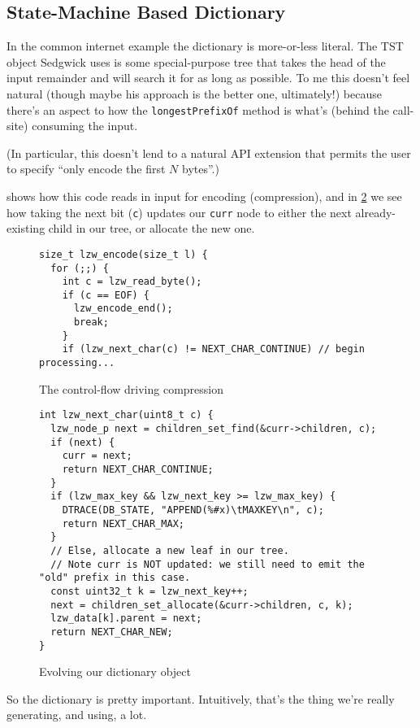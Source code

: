 \documentclass{scrartcl}
\begin{document}
\subsection{State-Machine Based Dictionary}
In the common internet example the dictionary is more-or-less literal.
The TST object Sedgwick uses is some special-purpose tree that takes the head of the input remainder and will search it for as long as possible.
To me this doesn't feel natural (though maybe his approach is the better one, ultimately!) because there's an aspect to how the \texttt{longestPrefixOf} method is what's (behind the call-site) consuming the input.

(In particular, this doesn't lend to a natural API extension that permits the user to specify ``only encode the first $N$ bytes''.)

 shows how this code reads in input for encoding (compression), and in \cref{lst:my-dictionary} we see how taking the next bit (\texttt{c}) updates our \texttt{curr} node to either the next already-existing child in our tree, or allocate the new one.

\begin{figure}
\begin{verbatim}
size_t lzw_encode(size_t l) {
  for (;;) {
    int c = lzw_read_byte();
    if (c == EOF) {
      lzw_encode_end();
      break;
    }
    if (lzw_next_char(c) != NEXT_CHAR_CONTINUE) // begin processing...
\end{verbatim}
\caption{The control-flow driving compression}\label{lst:my-input-code}
\end{figure}


\begin{figure}
\begin{verbatim}
int lzw_next_char(uint8_t c) {
  lzw_node_p next = children_set_find(&curr->children, c);
  if (next) {
    curr = next;
    return NEXT_CHAR_CONTINUE;
  }
  if (lzw_max_key && lzw_next_key >= lzw_max_key) {
    DTRACE(DB_STATE, "APPEND(%#x)\tMAXKEY\n", c);
    return NEXT_CHAR_MAX;
  }
  // Else, allocate a new leaf in our tree.
  // Note curr is NOT updated: we still need to emit the "old" prefix in this case.
  const uint32_t k = lzw_next_key++;
  next = children_set_allocate(&curr->children, c, k);
  lzw_data[k].parent = next;
  return NEXT_CHAR_NEW;
}
\end{verbatim}
\caption{Evolving our dictionary object}\label{lst:my-dictionary}
\end{figure}

So the dictionary is pretty important.
Intuitively, that's the thing we're really generating, and using, a lot.
\end{document}
